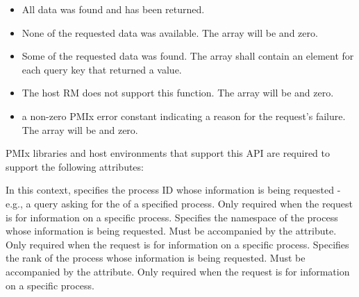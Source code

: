 \begin{itemize}
\item {} All data was found and has been returned.

\item {} None of the requested data was available.
The  array will be  and  zero.

\item {} Some of the requested data was found.
The  array shall contain an element for each query key that returned a value.

\item {} The host \ac{RM} does not support this function. The  array will be  and  zero.

\item a non-zero \ac{PMIx} error constant indicating a reason for the request's failure. The  array will be  and  zero.
\end{itemize}

\reqattrstart
\ac{PMIx} libraries and host environments that support this \ac{API} are required to support the following attributes:

In this context, specifies the process ID whose information is being requested - e.g., a query asking for the  of a specified process. Only required when the request is for information on a specific process.
\pasteAttributeItemEnd
{}Specifies the namespace of the process whose information is being requested. Must be accompanied by the  attribute. Only required when the request is for information on a specific process.
\pasteAttributeItemEnd
{}Specifies the rank of the process whose information is being requested. Must be accompanied by the  attribute. Only required when the request is for information on a specific process.
\pasteAttributeItemEnd
{}

